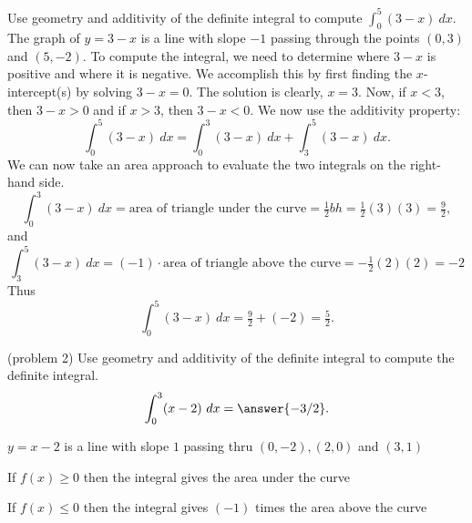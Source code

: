 \documentclass[handout]{ximera}
\begin{document}
\begin{example}[example 2]
Use geometry and additivity of the definite integral to compute  
$\displaystyle{\int_0^5  (3-x)  \ dx}$.
The graph of $y = 3-x$ is a line with slope $-1$ passing through the points $(0,3)$ and $(5,-2)$. To compute the integral,
we need to determine where $3-x$ is positive and where it is negative. We accomplish this by first finding the $x$-intercept(s)
by solving $3-x = 0$.  The solution is clearly, $x = 3$.  Now, if $x < 3$, then $3 - x >0$ and if
$x >3$, then $3-x <0$.
We now use the additivity property:
\[\int_0^5 (3-x) \ dx = \int_0^3 (3-x) \ dx  + \int_3^5 (3-x) \ dx.\]
We can now take an area approach to evaluate the two integrals on the right-hand side.
\[\int_0^3 (3-x) \ dx = \text{area of triangle under the curve} = \tfrac12bh = \tfrac12(3)(3) = \tfrac92,\]
and
\[\int_3^5 (3-x) \ dx = (-1)\cdot\text{area of triangle above the curve} = -\tfrac12(2)(2) = -2\]
Thus
\[\int_0^5 (3-x) \ dx = \tfrac92  + (-2) = \tfrac52.\]


\begin{image}
\end{image}

\end{example}


\begin{problem}(problem 2)
Use geometry and additivity of the definite integral to compute the definite integral.  
\[\int_0^3  (x-2)  \ dx= \answer{-3/2}.\]
\begin{hint}
$y=x-2$ is a line with slope $1$ passing thru $(0,-2), (2,0)$ and $(3,1)$
\end{hint}
\begin{hint}
If $f(x) \geq 0$ then the integral gives the area under the curve
\end{hint}
\begin{hint}
If $f(x) \leq 0$ then the integral gives $(-1)$ times the area above the curve
\end{hint}

\end{problem}
\end{document}
